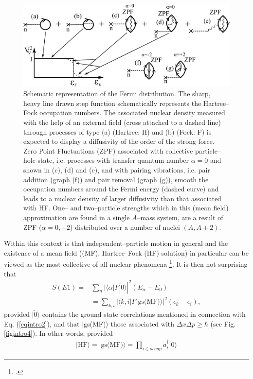 \begin{figure}
\centerline {
\includegraphics*[width=12cm]{introduccion/figs/fig1_2_2}
}
\caption{Schematic representation of the Fermi distribution. The sharp, heavy line drawn step function schematically represents the Hartree--Fock occupation numbers. The associated nuclear density measured with the help of an external field (cross attached to a dashed line) through processes of type (a) (Hartree: H) and (b) (Fock: F) is expected to display a diffusivity of the order of the strong force. Zero Point Fluctuations (ZPF) associated with collective particle--hole state, i.e. processes with transfer quantum number $\alpha=0$ and shown in (c), (d) and (e), and with pairing vibrations, i.e. pair addition (graph (f)) and pair removal (graph (g)), smooth the occupation numbers around the Fermi energy (dashed curve) and leads to a nuclear density of larger diffusivity than that associated with HF. One-- and two--particle strengths which in this (mean field) approximation are found in a single $A$--mass system, are a result of ZPF ($\alpha=0,\pm 2$) distributed over a number of nuclei $(A, A\pm 2)$.}
\label{fig1.2.2}
\end{figure}
Within this context is that independent--particle motion in general and the existence of a mean field ((MF), Hartree--Fock (HF) solution) in particular can be viewed as the most collective of all nuclear phenomena \footnote{\cite{Mottelson:62}.}. It is then not surprising that 
\begin{align}\label{eqintro6}
\nonumber S(E1)=&\sum_n |\langle \alpha|F|\tilde 0\rangle|^2(E_\alpha-E_0)\\
&=\sum_{k,i}|\langle k,i|F|\text{gs(MF)}\rangle|^2(\epsilon_{k}-\epsilon_i),
\end{align}
provided $|\tilde 0\rangle$ contains the ground state correlations mentioned in connection with Eq. (\ref{eqintro2}), and that $|$gs(MF)$\rangle$ those associated with $\Delta x\Delta p\geq \hbar$ (see Fig. \ref{figintro4}). In other words, provided
\begin{align}
|\text{HF}\rangle=|\text{gs(MF)}\rangle=\prod_{i\in occup}a^\dagger_i |0\rangle
\end{align}
